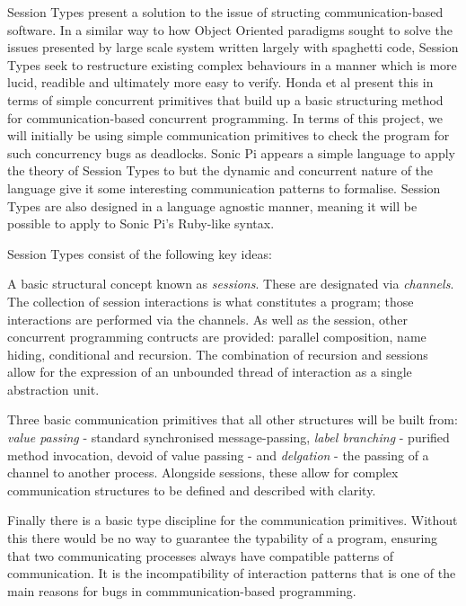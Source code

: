 \documentclass[11pt]{scrartcl}
\begin{document}
Session Types present a solution to the issue of structing communication-based 
software. In a similar way to how Object Oriented paradigms sought to solve 
the issues presented by large scale system written largely with spaghetti 
code, Session Types seek to restructure existing complex behaviours in a 
manner which is more lucid, readible and ultimately more easy to verify. Honda 
et al \cite{HVM98} present this in terms of simple concurrent primitives that 
build up a basic structuring method for communication-based concurrent 
programming. In terms of this project, we will initially be using simple 
communication primitives to check the program for such concurrency bugs as 
deadlocks. Sonic Pi appears a simple language to apply the theory of Session 
Types to but the dynamic and concurrent nature of the language give it some 
interesting communication patterns to formalise. Session Types 
are also designed in a language agnostic manner, meaning it will be possible to 
apply to Sonic Pi's Ruby-like syntax.

Session Types consist of the following key ideas:

A basic structural concept known as \emph{sessions}. These are designated via 
\emph{channels}. The collection of session interactions is what constitutes a 
program; those interactions are performed via the channels. As well as the 
session, other concurrent programming contructs are provided: parallel 
composition, name hiding, conditional and recursion. The combination of 
recursion and sessions allow for the expression of an unbounded thread of 
interaction as a single abstraction unit.

Three basic communication primitives that all other structures will be built 
from: \emph{value passing} - standard synchronised message-passing, \emph{
label branching} - purified method invocation, devoid of value passing - and 
\emph{delgation} - the passing of a channel to another process. Alongside 
sessions, these allow for complex communication structures to be defined and 
described with clarity.

Finally there is a basic type discipline for the communication primitives. 
Without this there would be no way to guarantee the typability of a program, 
ensuring that two communicating processes always have compatible patterns of 
communication. It is the incompatibility of interaction patterns that is one 
of the main reasons for bugs in commmunication-based programming.

\end{document}
